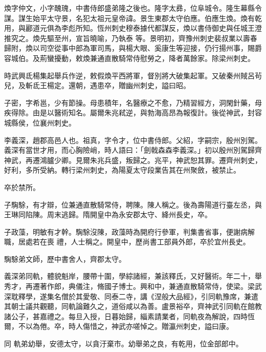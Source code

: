 \begin{pinyinscope}
 煥字仲文，小字醜瑰，中書侍郎盛弟隆之後也。隆字太彞，位阜城令。隆生幕縣令謀。謀生始平太守景，名犯太祖元皇帝諱。景生東郡太守伯應。伯應生煥。煥有乾用，與酈道元俱為李彪所知。恆州刺史穆泰據代都謀反，煥以書侍御史與任城王澄推究之。煥先驅至州，宣旨曉喻，乃執泰
 等。景明初，齊豫州刺史裴叔業以壽春歸附，煥以司空從事中郎為軍司馬，與楊大眼、奚康生等迎接，仍行揚州事，賜爵容城伯。及荊蠻擾動，敕煥兼通直散騎常侍慰勞之，降者萬餘家。除梁州刺史。



 時武興氐楊集起舉兵作逆，敕假煥平西將軍，督別將大破集起軍。又破秦州賊呂茍兒，及斬氐王楊定。還朝，遇患卒，贈幽州刺史，謚曰昭。



 子密，字希邕，少有節操。母患積年，名醫療之不愈，乃精習經方，洞閑針藥，母疾得除。由是以醫術知名。屬爾朱兆弒逆，與勃海高昂為報復計。後從神武，封容城縣侯，位襄州刺史。



 李義深，趙郡高邑人也。祖真，字令才，位中書侍郎。父紹，字嗣宗，殷州別駕。義深有當世才用，而心胸險峭，時人語曰：「劍戟森森李義深。」初以殷州別駕歸齊神武，再遷鴻臚少卿。見爾朱兆兵盛，叛歸之。兆平，神武恕其罪。遷齊州刺史，好利，多所受納。轉行梁州刺史，為陽夏太守段業告其在州聚斂，被禁止。



 卒於禁所。



 子騊駼，有才辯，位兼通直散騎常侍，聘陳。陳人稱之。後為壽陽道行臺左丞，與王琳同陷陳。周末逃歸。隋開皇中為永安郡太守、絳州長史，卒。



 子政藻，明敏有才幹。騊駼沒陳，政藻時為開府行參軍，判集書省事，便謝病解職，居處若在喪
 禮，人士稱之。開皇中，歷尚書工部員外郎，卒於宜州長史。



 騊駼弟文師，歷中書舍人，齊郡太守。



 義深弟同軌，體貌魁岸，腰帶十圍，學綜諸經，兼該釋氏，又好醫術。年二十，舉秀才，再遷著作郎，典儀注，脩國子博士。興和中，兼通直散騎常侍，使梁。梁武深耽釋學，遂集名僧於其愛敬、同泰二寺，講《涅般大品經》，引同軌豫席，兼遣其朝士議共觀聽，同軌論難久之，道俗咸以為善。盧景裕卒，齊神武引同軌在館教諸公子，甚嘉禮之。每旦入授，日暮始歸，緇素請業者，同軌夜為解說，四時恆爾，不以為倦。卒，時人傷惜之，神武亦嗟悼之。贈瀛州刺史，謚曰康。



 同
 軌弟幼舉，安德太守，以貪汙棄市。幼舉弟之良，有乾用，位金部郎中。




\end{pinyinscope}
